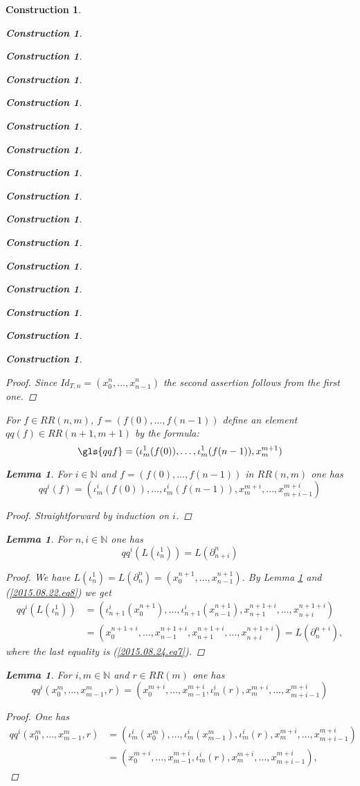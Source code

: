 \documentclass[onecolumn,12pt]{amsart}
\newtheorem{lemma}[proposition]{Lemma}
\numberwithin{proposition}{subsection}
\newtheorem{construction}[proposition]{Construction}
\newcommand{\nn}{{\mathbb N}}
\newcommand{\nat}{\nn}
\begin{document}
\begin{construction}
\begin{construction}
\begin{construction}
\begin{construction}
\begin{construction}
\begin{construction}
\begin{construction}
\begin{construction}
\begin{construction}
\begin{construction}
\begin{construction}
\begin{construction}
\begin{construction}
\begin{construction}
\begin{construction}
\begin{construction}
\begin{proof}
Since $Id_{T,n}=(x_0^n,\dots,x_{n-1}^n)$ the second assertion follows from the first one.
\end{proof}
%
For $f\in RR(n,m)$, $f=(f(0),\dots,f(n-1))$ define an element $qq(f)\in RR(n+1,m+1)$ by the formula: 
%
\begin{equation}\label{2015.08.26.eq9}
\gls{qqf}=(\iota_m^1(f(0)),\dots,\iota_m^1(f(n-1)),x_m^{m+1})
\end{equation}%
%
\begin{lemma}
\label{2015.08.26.l2}
For $i\in\nat$ and $f=(f(0),\dots,f(n-1))$ in $RR(n,m)$ one has
%
$$qq^i(f)=(\iota_m^i(f(0)),\dots,\iota_m^i(f(n-1)),x_m^{m+i},\dots,x_{m+i-1}^{m+i})$$
%
\end{lemma}
%
\begin{proof}
Straightforward by induction on $i$.
\end{proof}
%
\begin{lemma}
\label{2015.08.26.l3a}
For $n,i\in\nat$ one has
%
$$qq^i(L(\iota_n^1))=L(\partial^n_{n+i})$$
%
\end{lemma}
%
\begin{proof}
We have ${L}(\iota_n^1)=L(\partial_n^n)=(x_0^{n+1},\dots,x^{n+1}_{n-1})$. By
Lemma \ref{2015.08.26.l2} and (\ref{2015.08.22.eq8}) we get
\begin{equation*}
  \begin{split}
    qq^i({L}(\iota_n^1))&=(\iota_{n+1}^i(x_0^{n+1}),\dots,\iota_{n+1}^i(x_{n-1}^{n+1}),x_{n+1}^{n+1+i},\dots,x_{n+i}^{n+1+i})
    \\
    &=(x_0^{n+1+i},\dots,x_{n-1}^{n+1+i},x_{n+1}^{n+1+i},\dots,x_{n+i}^{n+1+i})=L(\partial_n^{n+i}),
  \end{split}
\end{equation*}
where the last equality is (\ref{2015.08.24.eq7}). 
\end{proof}
%
\begin{lemma}
\label{2015.08.28.l1}
For $i,m\in\nat$ and $r\in RR(m)$ one has
%
$$qq^i(x_0^m,\dots,x^m_{m-1},r)=(x_0^{m+i},\dots,x^{m+i}_{m-1},\iota_m^i(r),x_m^{m+i},\dots,x_{m+i-1}^{m+i})$$
%
\end{lemma}
%
\begin{proof}
One has
\begin{equation*}
  \begin{split}
    qq^i(x_0^m,\dots,x^m_{m-1},r)&=(\iota_m^i(x_0^m),\dots,\iota_m^i(x^m_{m-1}),\iota_m^i(r),x_m^{m+i},\dots,x_{m+i-1}^{m+i})
    \\&=(x_0^{m+i},\dots,x^{m+i}_{m-1},\iota_m^i(r),x_m^{m+i},\dots,x_{m+i-1}^{m+i}),
  \end{split}

\end{equation*}
\end{proof}
\end{construction}
\end{construction}
\end{construction}
\end{construction}
\end{construction}
\end{construction}
\end{construction}
\end{construction}
\end{construction}
\end{construction}
\end{construction}
\end{construction}
\end{construction}
\end{construction}
\end{construction}
\end{construction}
\end{document}
